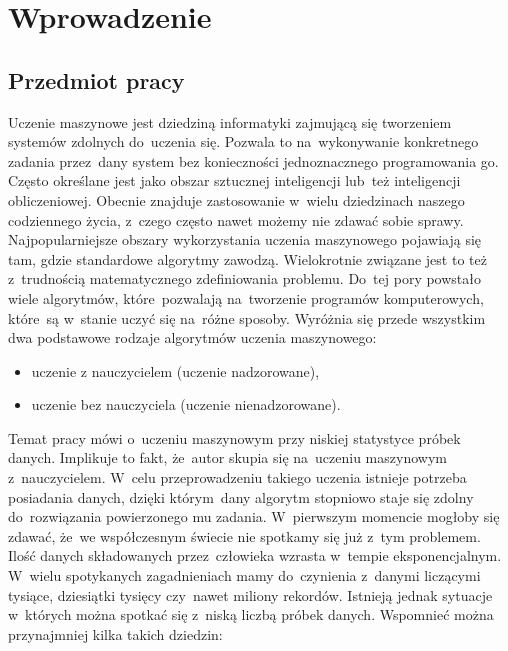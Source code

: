 \section{Wprowadzenie}\label{intro}
\subsection{Przedmiot pracy}\label{matter}
Uczenie maszynowe jest dziedziną informatyki zajmującą się tworzeniem systemów zdolnych do~uczenia się. Pozwala to na~wykonywanie konkretnego zadania przez~dany system bez konieczności jednoznacznego programowania go. 
Często określane jest jako obszar sztucznej inteligencji lub~też inteligencji obliczeniowej\cite{stefanowski}. Obecnie znajduje zastosowanie w~wielu dziedzinach naszego codziennego życia, z~czego często nawet możemy nie zdawać sobie sprawy.
Najpopularniejsze obszary wykorzystania uczenia maszynowego pojawiają się tam, gdzie standardowe algorytmy zawodzą. Wielokrotnie związane jest to też z~trudnością matematycznego zdefiniowania problemu. 
 Do~tej pory powstało wiele algorytmów, które~pozwalają na~tworzenie programów komputerowych, które~są w~stanie uczyć się na~różne sposoby. Wyróżnia się przede wszystkim dwa podstawowe rodzaje algorytmów uczenia maszynowego:
\begin{itemize}
\item uczenie z nauczycielem (uczenie nadzorowane),
\item uczenie bez nauczyciela (uczenie nienadzorowane).
\end{itemize}
Temat pracy mówi o~uczeniu maszynowym przy niskiej statystyce próbek danych. Implikuje to fakt, że~autor skupia się na~uczeniu maszynowym z~nauczycielem. W~celu przeprowadzeniu takiego uczenia istnieje potrzeba posiadania danych, dzięki którym~dany algorytm stopniowo staje się zdolny do~rozwiązania powierzonego mu zadania. W~pierwszym momencie mogłoby się zdawać, że~we współczesnym świecie nie spotkamy się już z~tym problemem. Ilość danych składowanych przez~człowieka wzrasta w~tempie eksponencjalnym. W~wielu spotykanych zagadnieniach mamy do~czynienia z~danymi liczącymi tysiące, dziesiątki tysięcy czy~nawet miliony rekordów. Istnieją jednak sytuacje w~których można spotkać się z~niską liczbą próbek danych. Wspomnieć można przynajmniej kilka takich dziedzin:
